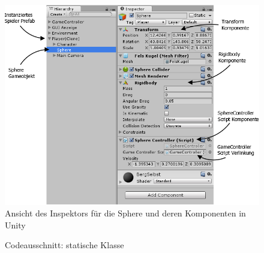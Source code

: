 \begin{figure}[H]
\centering
\caption{Ansicht des Inspektors für die Sphere und deren Komponenten in Unity}\vspace{0.25cm}
\label{Abb:SphereInspector}
\includegraphics[scale=0.45]{Bilder/SphereInspector.png}
\end{figure}

\begin{figure}[H]
\caption{Codeausschnitt:  statische Klasse}
\label{Abb:stSphere}

\end{figure}
